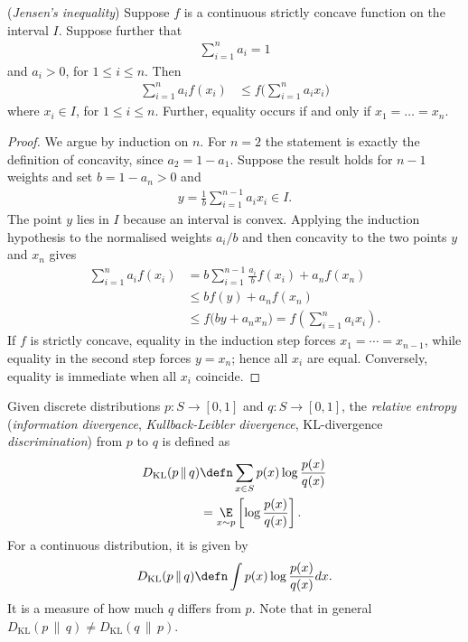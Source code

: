 \documentclass[a4paper, 12pt]{book}
\begin{document}
\begin{theorem}
    (\emph{Jensen's inequality}) Suppose $f$ is a continuous strictly concave function on the interval $I$. Suppose further that
    \begin{align}
        \sum_{i=1}^n a_i = 1
    \end{align}
    and $a_i > 0$, for $1 \leq i \leq n$. Then 
    \begin{align}
        \sum_{i=1}^n a_i f(x_i) &\leq f\bigg( \sum_{i=1}^n a_i x_i\bigg)
    \end{align}
    where $x_i \in I$, for $1 \leq i \leq n$. Further, equality occurs if and only if $x_1 = \ldots = x_n$.
\end{theorem}
\begin{proof}
    We argue by induction on $n$. For $n=2$ the statement is exactly the definition of concavity, since $a_2=1-a_1$.
    Suppose the result holds for $n-1$ weights and set $b=1-a_n>0$ and
    \begin{align}
        y = \frac{1}{b}\sum_{i=1}^{n-1} a_i x_i \in I .
    \end{align}
    The point $y$ lies in $I$ because an interval is convex. Applying the induction hypothesis to the normalised weights $a_i/b$ and then concavity to the two points $y$ and $x_n$ gives
    \begin{align}
        \sum_{i=1}^n a_i f(x_i)
        &= b\sum_{i=1}^{n-1}\frac{a_i}{b}f(x_i) + a_n f(x_n) \\
        &\leq b f(y) + a_n f(x_n) \\
        &\leq f\big( b y + a_n x_n \big)
        = f\left( \sum_{i=1}^n a_i x_i \right).
    \end{align}
    If $f$ is strictly concave, equality in the induction step forces $x_1=\cdots=x_{n-1}$, while equality in the second step forces $y=x_n$; hence all $x_i$ are equal. Conversely, equality is immediate when all $x_i$ coincide.
\end{proof}


\begin{definition}
    Given discrete distributions $p: S \to [0,1]$ and $q: S \to [0,1]$, the \emph{relative entropy} (\emph{information divergence}, \emph{Kullback-Leibler divergence}, $\mathrm{KL}$-divergence  \emph{discrimination}) from $p$ to $q$ is defined as
    \begin{align}
    D_{\mathrm{KL}}(p\,\|\,q) &\defn \sum_{x \in S} p(x)\log\frac{p(x)}{q(x)}\\
    &= \underset{x\sim p}{\E}\left[\log\frac{p(x)}{q(x)}\right].
    \end{align}
    For a continuous distribution, it is given by
    \begin{align}
        D_{\mathrm{KL}}(p\,\|\,q) \defn \int p(x)\log\frac{p(x)}{q(x)} dx.
    \end{align}
    It is a measure of how much $q$ differs from $p$. Note that in general $D_{\mathrm{KL}}(p\,\|\,q) \neq D_{\mathrm{KL}}(q\,\|\,p)$.
\end{definition}
\end{document}
